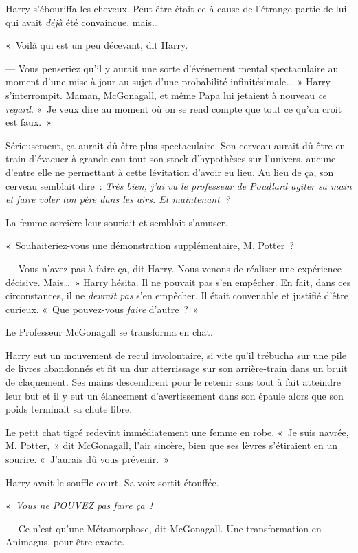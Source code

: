 Harry s'ébouriffa les cheveux. Peut-être était-ce à cause de l'étrange partie de lui qui avait \emph{déjà} été convaincue, mais…

«~Voilà qui est un peu décevant, dit Harry.

--- Vous penseriez qu'il y aurait une sorte d'événement mental spectaculaire au moment d'une mise à jour au sujet d'une probabilité infinitésimale…~» Harry s'interrompit. Maman, McGonagall, et même Papa lui jetaient à nouveau \emph{ce regard}. «~Je veux dire au moment où on se rend compte que tout ce qu'on croit est faux.~»

Sérieusement, ça aurait dû être plus spectaculaire. Son cerveau aurait dû être en train d'évacuer à grande eau tout son stock d'hypothèses sur l'univers, aucune d'entre elle ne permettant à cette lévitation d'avoir eu lieu. Au lieu de ça, son cerveau semblait dire~: \emph{Très bien, j'ai vu le professeur de Poudlard agiter sa main et faire voler ton père dans les airs. Et maintenant~?}

La femme sorcière leur souriait et semblait s'amuser.

«~Souhaiteriez-vous une démonstration supplémentaire, M. Potter~?

--- Vous n'avez pas à faire ça, dit Harry. Nous venons de réaliser une expérience décisive. Mais…~» Harry hésita. Il ne pouvait pas s'en empêcher. En fait, dans ces circonstances, il ne \emph{devrait pas} s'en empêcher. Il était convenable et justifié d'être curieux. «~Que pouvez-vous \emph{faire} d'autre~?~»

Le Professeur McGonagall se transforma en chat.

Harry eut un mouvement de recul involontaire, si vite qu'il trébucha sur une pile de livres abandonnés et fit un dur atterrissage sur son arrière-train dans un bruit de claquement. Ses mains descendirent pour le retenir sans tout à fait atteindre leur but et il y eut un élancement d'avertissement dans son épaule alors que son poids terminait sa chute libre.

Le petit chat tigré redevint immédiatement une femme en robe. «~Je suis navrée, M. Potter,~» dit McGonagall, l'air sincère, bien que ses lèvres s'étiraient en un sourire. «~J'aurais dû vous prévenir.~»

Harry avait le souffle court. Sa voix sortit étouffée.

«~\emph{Vous ne POUVEZ pas faire ça~!}

--- Ce n'est qu'une Métamorphose, dit McGonagall. Une transformation en Animagus, pour être exacte.

